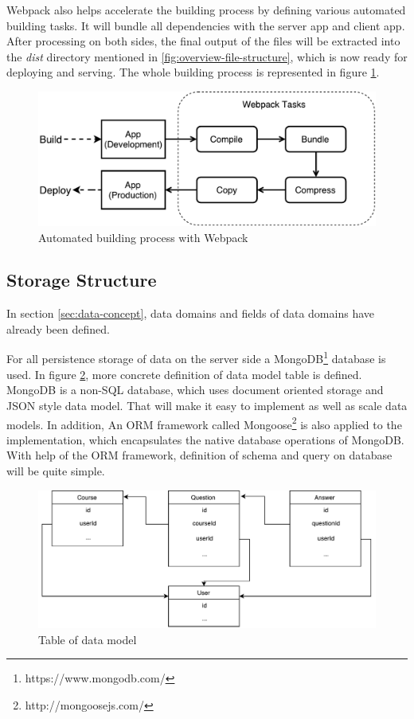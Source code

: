 Webpack also helps accelerate the building process by defining various automated building tasks. It will bundle all dependencies with the server app and client app. After processing on both sides, the final output of the files will be extracted into the \textit{dist} directory mentioned in \ref{fig:overview-file-structure}, which is now ready for deploying and serving. The whole building process is represented in figure \ref{fig:automated-building-imp}.

\begin{figure}[!htbp]
  \centering
    \includegraphics[width=1\textwidth]{Figures/imp-automated-building.pdf}
  \caption{Automated building process with Webpack}
  \label{fig:automated-building-imp}
\end{figure}

\subsection{Storage Structure} \label{subsec:storage-structure-imp}
In section \ref{sec:data-concept}, data domains and fields of data domains  have already been defined. 

For all persistence storage of data on the server side a MongoDB\footnote{https://www.mongodb.com/} database is used.  In figure \ref{fig:data-model-table-imp}, more concrete definition of data model table is defined. MongoDB is a non-SQL database, which uses document oriented storage and JSON style data model. That will make it easy to implement as well as scale data models. In addition, An \gls{ORM} framework called Mongoose\footnote{http://mongoosejs.com/} is also applied to the implementation, which encapsulates the native database operations of MongoDB. With help of the \gls{ORM} framework, definition of schema and query on database will be quite simple. 


\begin{figure}[!htbp]
  \centering
    \includegraphics[width=1\textwidth]{Figures/concept-data-domain-relation.pdf}
  \caption{Table of data model}
  \label{fig:data-model-table-imp}
\end{figure}
